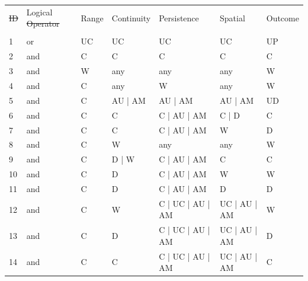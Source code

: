 \documentclass[authoryear,preprint,review,12pt]{elsarticle}
\makeatletter
\providecommand{\DIFadd}[1]{{\protect\color{blue}\uwave{#1}}} %
\providecommand{\DIFdel}[1]{{\protect\color{red}\sout{#1}}} %
\providecommand{\DIFaddFL}[1]{\DIFadd{#1}} %
\providecommand{\DIFdelFL}[1]{\DIFdel{#1}} %
\providecommand{\DIFaddbeginFL}{} %
\providecommand{\DIFaddendFL}{} %
\providecommand{\DIFdelbeginFL}{} %
\providecommand{\DIFdelendFL}{} %
\let\sout@orig\sout %
\renewcommand{\sout}[1]{\ifmmode\text{\sout@orig{\ensuremath{#1}}}\else\sout@orig{#1}\fi} %
\makeatother
\begin{document}
\begin{table}[h]
    \DIFaddendFL \begin{scriptsize}
    \centering
    \begin{tabular}{l l l l l l l}
        \hline
      \DIFdelbeginFL \DIFdelFL{ID }\DIFdelendFL \DIFaddbeginFL \DIFaddFL{Rule }\DIFaddendFL & Logical  \DIFdelbeginFL \DIFdelFL{Operator }\DIFdelendFL & Range & Continuity & Persistence      & Spatial      & Outcome \\
        \DIFaddbeginFL \DIFaddFL{ID }& \DIFaddFL{Operator }&       &            &                  &              &         \\
        \DIFaddendFL \hline
        1  & or               & UC    & UC         & UC               & UC           & UP \\
        2  & and              & C     & C          & C                & C            & C  \\
        3  & and              & W     & any        & any              & any          & W  \\
        4  & and              & C     & any        & W                & any          & W  \\
        5  & and              & C     & AU | AM    & AU | AM          & AU | AM      & UD \\
        6  & and              & C     & C          & C | AU | AM      & C | D        & C  \\
        7  & and              & C     & C          & C | AU | AM      & W            & D  \\
        8  & and              & C     & W          & any              & any          & W  \\
        9  & and              & C     & D | W      & C | AU | AM      & C            & C  \\
        10 & and              & C     & D          & C | AU | AM      & W            & W  \\
        11 & and              & C     & D          & C | AU | AM      & D            & D  \\
        12 & and              & C     & W          & C | UC | AU | AM & UC | AU | AM & W  \\
        13 & and              & C     & D          & C | UC | AU | AM & UC | AU | AM & D  \\
        14 & and              & C     & C          & C | UC | AU | AM & UC | AU | AM & C  \\

\end{tabular}
\end{scriptsize}
\end{table}
\end{document}
